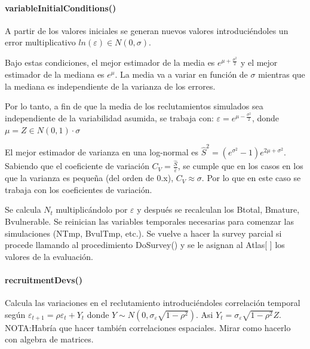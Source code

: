 \documentclass[12pt, oneside, a4paper]{article}
\begin{document}
			\paragraph{variableInitialConditions()}
				A partir de los valores iniciales se generan nuevos valores introduciéndoles un error multiplicativo $ln(\varepsilon) \in N(0,\sigma)$.
				 \par Bajo estas condiciones, el mejor estimador de la media es $e^{\mu+\frac{\sigma^2}{2}}$ y el mejor estimador de la mediana es $e^{\mu}$. La media va a variar en función de $\sigma$ mientras que la mediana es independiente de la varianza de los errores. 
				\par Por lo tanto, a fin de que la media de los reclutamientos simulados sea independiente de la variabilidad asumida, se trabaja con:
				$\varepsilon=e^{\mu-\frac{\sigma^2}{2}}$, 
				donde $\mu= Z\in N(0,1) \cdot \sigma$
				\par El mejor estimador de varianza en una log-normal es $\hat{S}^2=(e^{\sigma^2}-1)e^{2\mu+\sigma^2}$. Sabiendo que el coeficiente de variación $C_V=\frac{\hat{S}}{\bar{\varepsilon}}$, se cumple que en los casos en los que la varianza es pequeña (del orden de 0.x), $C_V \approx \sigma$. Por lo que en este caso se trabaja con los coeficientes de variación.
				\par Se calcula $N_t$ multiplicándolo por $\varepsilon$ y después se recalculan los Btotal, Bmature, Bvulnerable. Se reinician las variables temporales necesarias para comenzar las simulaciones (NTmp, BvulTmp, etc.). Se vuelve a hacer la survey parcial si procede llamando al procedimiento DoSurvey() y se le asignan al Atlas[ ] los valores de la evaluación. 
			
			\paragraph{recruitmentDevs()}
				Calcula las variaciones en el reclutamiento introduciéndoles correlación temporal según $\varepsilon_{t+1}= \rho \varepsilon_t + Y_t$ donde $Y \sim N(0, \sigma_{\varepsilon} \sqrt{1-\rho^2})$. 
				Asi $Y_t= \sigma_{\varepsilon} \sqrt{1-\rho^2} Z$.
				NOTA:Habría que hacer también correlaciones espaciales. Mirar como hacerlo con algebra de matrices.
				
			
\end{document}
